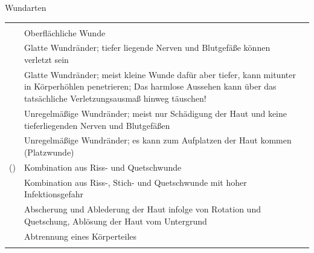 \TableWide
{Wundarten}%
{}%
{\label{tab:Wundarten}}%
{}%
{}%
{%
\begin{tabulary}{\linewidth}{lLL}\addlinespace\toprule\addlinespace
\noindent{} & \noindent{} & \noindent{}
\\\addlinespace\midrule\addlinespace
\noindent{} 
&
Oberflächliche Wunde
& 
\noindent{}
\\\addlinespace
\noindent{}
&
Glatte Wundränder; tiefer liegende Nerven und Blutgefäße
können verletzt sein
& 
\noindent{}
\\\addlinespace
\noindent{}
&
Glatte Wundränder; meist kleine Wunde dafür aber tiefer,
kann mitunter in Körperhöhlen penetrieren; Das harmlose
Aussehen kann über das tatsächliche Verletzungsausmaß hinweg
täuschen!
& 
\noindent{}
\\\addlinespace 
\noindent{}
&
Unregelmäßige Wundränder; meist nur Schädigung der Haut und
	keine tieferliegenden Nerven und Blutgefäßen
& 
\noindent{}
\\\addlinespace
\noindent{}
&
Unregelmäßige Wundränder; es kann zum Aufplatzen der Haut kommen (Platzwunde)
& 
\noindent{}
\\\addlinespace
\noindent{} ()
&
Kombination aus Riss- und Quetschwunde
& 
\noindent{}
\\\addlinespace
\noindent{} 
&
Kombination aus Riss-, Stich- und Quetschwunde mit hoher Infektionsgefahr
& 
\noindent{}
\\\addlinespace
\noindent{} 
&
Abscherung und Ablederung der Haut infolge von Rotation und Quetschung, Ablösung der Haut vom Untergrund
& 
\noindent{}
\\\addlinespace
\noindent{} 
&
Abtrennung eines Körperteiles
& 
\noindent{}
\\\addlinespace
\noindent{} 
&

\end{tabulary}}
